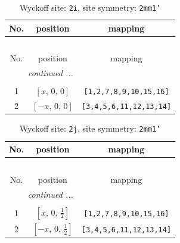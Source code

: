 \documentclass[fleqn,8pt]{jsarticle}
\begin{document}
\renewcommand{\arraystretch}{1.2}
\begin{longtable}{ccc}
\caption{Wyckoff site: {\tt 2i}, site symmetry: {\tt 2mm1'}}
 \\
 \hline \hline
No. & position & mapping \\ \hline \endfirsthead

\multicolumn{2}{l}{\tablename\ \thetable{}} \\
 \hline \hline
No. & position & mapping \\ \hline \endhead

 \hline \hline
\multicolumn{2}{r}{\footnotesize\it continued ...} \\ \endfoot

 \hline \hline
\multicolumn{2}{r}{} \\ \endlastfoot

1 & $\left[ x,\, 0,\, 0 \right]$ & {\tt [1,2,7,8,9,10,15,16]} \\ \hline
2 & $\left[ - x,\, 0,\, 0 \right]$ & {\tt [3,4,5,6,11,12,13,14]} \\
\end{longtable}
\renewcommand{\arraystretch}{1.2}
\begin{longtable}{ccc}
\caption{Wyckoff site: {\tt 2j}, site symmetry: {\tt 2mm1'}}
 \\
 \hline \hline
No. & position & mapping \\ \hline \endfirsthead

\multicolumn{2}{l}{\tablename\ \thetable{}} \\
 \hline \hline
No. & position & mapping \\ \hline \endhead

 \hline \hline
\multicolumn{2}{r}{\footnotesize\it continued ...} \\ \endfoot

 \hline \hline
\multicolumn{2}{r}{} \\ \endlastfoot

1 & $\left[ x,\, 0,\, \frac{1}{2} \right]$ & {\tt [1,2,7,8,9,10,15,16]} \\ \hline
2 & $\left[ - x,\, 0,\, \frac{1}{2} \right]$ & {\tt [3,4,5,6,11,12,13,14]} \\
\end{longtable}
\renewcommand{\arraystretch}{1.2}
\end{document}
